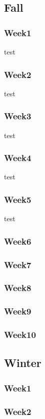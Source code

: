 \subsection*{Fall}
	\subsubsection*{Week1}
		test
	\subsubsection*{Week2}
		test
	\subsubsection*{Week3}
		test
	\subsubsection*{Week4}
		test
	\subsubsection*{Week5}
		test
	\subsubsection*{Week6}
	\subsubsection*{Week7}
	\subsubsection*{Week8}
	\subsubsection*{Week9}
	\subsubsection*{Week10}

\subsection*{Winter}
	\subsubsection*{Week1}
	\subsubsection*{Week2}

